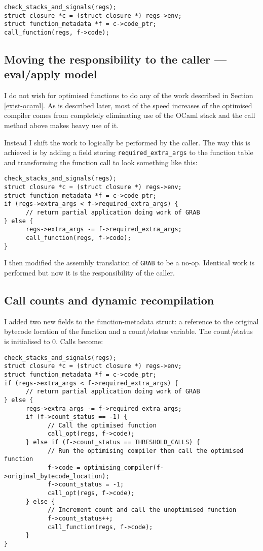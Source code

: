 \begin{verbatim}
check_stacks_and_signals(regs);
struct closure *c = (struct closure *) regs->env;
struct function_metadata *f = c->code_ptr;
call_function(regs, f->code);
\end{verbatim}

\subsection{Moving the responsibility to the caller --- eval/apply model}

I do not wish for optimised functions to do any of the work described in Section \ref{exist-ocaml}.
As is described later, most of the speed increases of the optimised compiler comes from completely
eliminating use of the OCaml stack and the call method above makes heavy use of it.

Instead I shift the work to logically be performed by the caller. The way this is achieved is by
adding a
field storing \texttt{required\_extra\_args} to the function table and transforming the function
call to look something like this:

\begin{verbatim}
check_stacks_and_signals(regs);
struct closure *c = (struct closure *) regs->env;
struct function_metadata *f = c->code_ptr;
if (regs->extra_args < f->required_extra_args) {
      // return partial application doing work of GRAB
} else {
      regs->extra_args -= f->required_extra_args;
      call_function(regs, f->code);
}
\end{verbatim}

I then modified the assembly translation of \texttt{GRAB} to be a no-op. Identical work is
performed but now it is the responsibility of the caller.

\subsection{Call counts and dynamic recompilation} \label{final-call-logic}

I added two new fields to the function-metadata struct: a reference to the original bytecode
location
of the function and a count/status variable.  The count/status is initialised to 0. Calls become:

\begin{verbatim}
check_stacks_and_signals(regs);
struct closure *c = (struct closure *) regs->env;
struct function_metadata *f = c->code_ptr;
if (regs->extra_args < f->required_extra_args) {
      // return partial application doing work of GRAB
} else { 
      regs->extra_args -= f->required_extra_args;
      if (f->count_status == -1) {
            // Call the optimised function
            call_opt(regs, f->code);
      } else if (f->count_status == THRESHOLD_CALLS) {
            // Run the optimising compiler then call the optimised function
            f->code = optimising_compiler(f->original_bytecode_location);
            f->count_status = -1;
            call_opt(regs, f->code);
      } else {
            // Increment count and call the unoptimised function 
            f->count_status++;
            call_function(regs, f->code);
      }
}
\end{verbatim}

